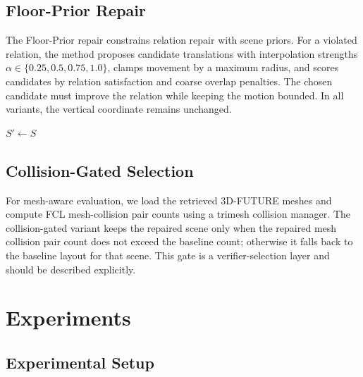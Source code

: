 \documentclass{egpubl}
\newcommand{\fp}{Floor-Prior}
\begin{document}
\subsection{Floor-Prior Repair}

The \fp{} repair constrains relation repair with scene priors. For a violated relation, the method proposes candidate translations with interpolation strengths $\alpha \in \{0.25,0.5,0.75,1.0\}$, clamps movement by a maximum radius, and scores candidates by relation satisfaction and coarse overlap penalties. The chosen candidate must improve the relation while keeping the motion bounded. In all variants, the vertical coordinate remains unchanged.

\begin{algorithm}[t]
\caption{\fp{} relation repair}
\label{alg:floor-prior}
\DontPrintSemicolon
{}
$S' \leftarrow S$\;
\;
\end{algorithm}

\subsection{Collision-Gated Selection}

For mesh-aware evaluation, we load the retrieved 3D-FUTURE meshes and compute FCL mesh-collision pair counts using a trimesh collision manager. The collision-gated variant keeps the repaired scene only when the repaired mesh collision pair count does not exceed the baseline count; otherwise it falls back to the baseline layout for that scene. This gate is a verifier-selection layer and should be described explicitly.

\section{Experiments}

\subsection{Experimental Setup}
\end{document}
